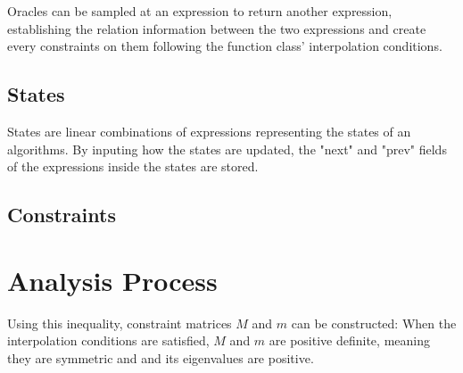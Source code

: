 Oracles can be sampled at an expression to return another expression, establishing the relation information between the two expressions and create every constraints on them following the function class' interpolation conditions.

\subsection*{States}
States are linear combinations of expressions representing the states of an algorithms. By inputing how the states are updated, the "next" and "prev" fields of the expressions inside the states are stored.

\subsection*{Constraints}

\section{Analysis Process}

Using this inequality, constraint matrices \(M\) and \(m\) can be constructed:
When the interpolation conditions are satisfied, \(M\) and \(m\) are positive definite, meaning they are symmetric and and its eigenvalues are positive.
